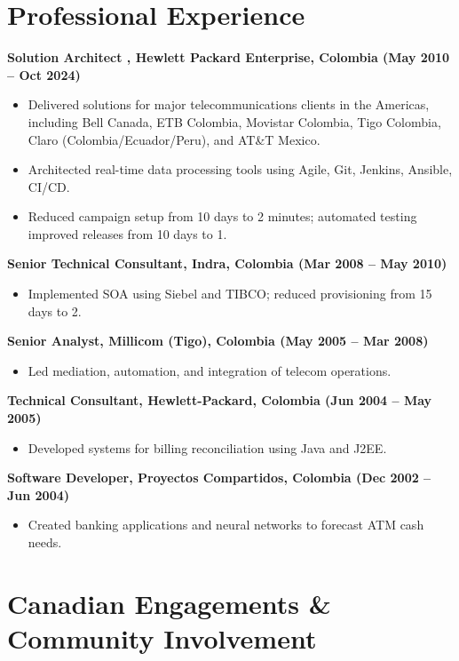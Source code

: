 \documentclass[a4paper,10pt]{article}
\begin{document}
\section*{\textcolor{myblue}{Professional Experience}}
\textbf{Solution Architect , Hewlett Packard Enterprise, Colombia (May 2010 – Oct 2024)}
\begin{itemize}
    \item Delivered solutions for major telecommunications clients in the Americas, including Bell Canada, ETB Colombia, Movistar Colombia, Tigo Colombia, Claro (Colombia/Ecuador/Peru), and AT\&T Mexico.
    \item Architected real-time data processing tools using Agile, Git, Jenkins, Ansible, CI/CD.
    \item Reduced campaign setup from 10 days to 2 minutes; automated testing improved releases from 10 days to 1.
\end{itemize}

\textbf{Senior Technical Consultant, Indra, Colombia (Mar 2008 – May 2010)}
\begin{itemize}
    \item Implemented SOA using Siebel and TIBCO; reduced provisioning from 15 days to 2.
\end{itemize}

\textbf{Senior Analyst, Millicom (Tigo), Colombia (May 2005 – Mar 2008)}
\begin{itemize}
    \item Led mediation, automation, and integration of telecom operations.
\end{itemize}

\textbf{Technical Consultant, Hewlett-Packard, Colombia (Jun 2004 – May 2005)}
\begin{itemize}
    \item Developed systems for billing reconciliation using Java and J2EE.
\end{itemize}

\textbf{Software Developer, Proyectos Compartidos, Colombia (Dec 2002 – Jun 2004)}
\begin{itemize}
    \item Created banking applications and neural networks to forecast ATM cash needs.
\end{itemize}

\section*{\textcolor{myblue}{Canadian Engagements \& Community Involvement}}
\end{document}
